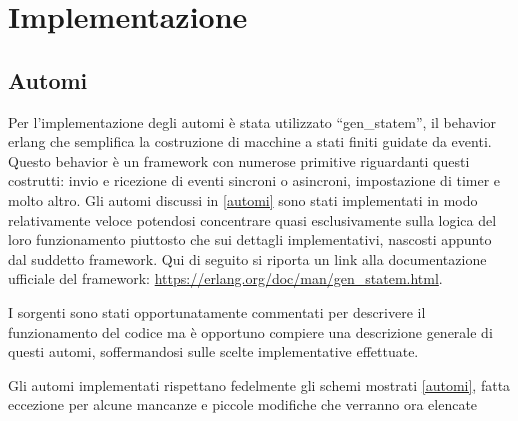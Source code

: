
\chapter{Implementazione}

\section{Automi} \label{implementazioneAutomi}
Per l'implementazione degli automi è stata utilizzato ``gen\_statem'', il behavior erlang che semplifica la costruzione di macchine a stati finiti guidate da eventi. Questo behavior è un framework con numerose primitive riguardanti questi costrutti: invio e ricezione di eventi sincroni o asincroni, impostazione di timer e molto altro. Gli automi discussi in \ref{automi} sono stati implementati in modo relativamente veloce potendosi concentrare quasi esclusivamente sulla logica del loro funzionamento piuttosto che sui dettagli implementativi, nascosti appunto dal suddetto framework. 
Qui di seguito si riporta un link alla documentazione ufficiale del framework: \url{https://erlang.org/doc/man/gen_statem.html}.

I sorgenti sono stati opportunatamente commentati per descrivere il funzionamento del codice ma è opportuno compiere una descrizione generale di questi automi, soffermandosi sulle scelte implementative effettuate.

Gli automi implementati rispettano fedelmente gli schemi mostrati \ref{automi}, fatta eccezione per alcune mancanze e piccole modifiche che verranno ora elencate

